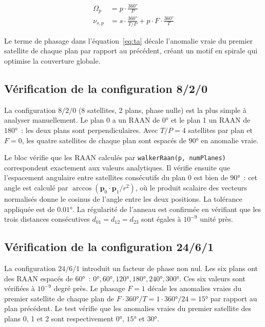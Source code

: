 \documentclass[12pt,a4paper]{article}
\begin{document}
\begin{align}
    \Omega_p &= p \cdot \frac{360°}{P} \label{eq:raan} \\
    \nu_{s,p} &= s \cdot \frac{360°}{T/P} + p \cdot F \cdot \frac{360°}{T} \label{eq:ta}
\end{align}

Le terme de phasage dans l'équation~\eqref{eq:ta} décale l'anomalie vraie du premier satellite de chaque plan par rapport au précédent, créant un motif en spirale qui optimise la couverture globale.

\subsection{Vérification de la configuration 8/2/0}

La configuration $8/2/0$ (8 satellites, 2 plans, phase nulle) est la plus simple à analyser manuellement. Le plan 0 a un RAAN de $0°$ et le plan 1 un RAAN de $180°$~: les deux plans sont perpendiculaires. Avec $T/P = 4$ satellites par plan et $F = 0$, les quatre satellites de chaque plan sont espacés de $90°$ en anomalie vraie.

Le bloc vérifie que les RAAN calculés par \texttt{walkerRaan(p, numPlanes)} correspondent exactement aux valeurs analytiques. Il vérifie ensuite que l'espacement angulaire entre satellites consécutifs du plan 0 est bien de $90°$~: cet angle est calculé par $\arccos(\mathbf{p}_0 \cdot \mathbf{p}_1 / r^2)$, où le produit scalaire des vecteurs normalisés donne le cosinus de l'angle entre les deux positions. La tolérance appliquée est de $0.01°$. La régularité de l'anneau est confirmée en vérifiant que les trois distances consécutives $d_{01} = d_{12} = d_{23}$ sont égales à $10^{-9}$ unité près.

\subsection{Vérification de la configuration 24/6/1}

La configuration $24/6/1$ introduit un facteur de phase non nul. Les six plans ont des RAAN espacés de $60°$~: $0°, 60°, 120°, 180°, 240°, 300°$. Ces six valeurs sont vérifiées à $10^{-9}$ degré près. Le phasage $F = 1$ décale les anomalies vraies du premier satellite de chaque plan de $F \cdot 360° / T = 1 \cdot 360° / 24 = 15°$ par rapport au plan précédent. Le test vérifie que les anomalies vraies du premier satellite des plans 0, 1 et 2 sont respectivement $0°$, $15°$ et $30°$.
\end{document}
